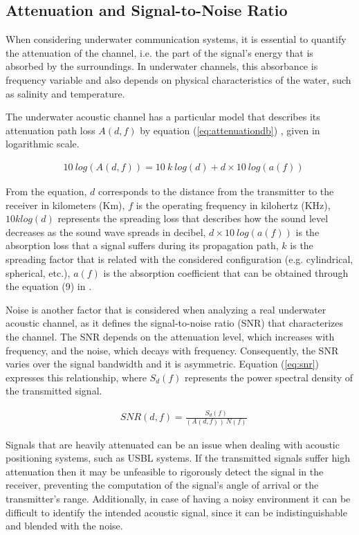 \subsection{Attenuation and Signal-to-Noise Ratio} \label{subsec:snr}

When considering underwater communication systems, it is essential to quantify the attenuation of the channel, i.e. the part of the signal's energy that is absorbed by the surroundings. In underwater channels, this absorbance is frequency variable and also depends on physical characteristics of the water, such as salinity and temperature. 

The underwater acoustic channel has a particular model that describes its attenuation path loss \(A(d,f)\) by equation (\ref{eq:attenuationdb}) \cite{pathloss}, given in logarithmic scale. 

\begin{eqnarray}
&10\ log(A(d,f)) = 10\ k\ log(d) + d \times 10\ log(a(f))
\label{eq:attenuationdb}
\end{eqnarray}

From the equation, \(d\) corresponds to the distance from the transmitter to the receiver in kilometers (Km), \(f\) is the operating frequency in kilohertz (KHz), \(10klog(d)\) represents the spreading loss that describes how the sound level decreases as the sound wave spreads in decibel, \(d \times 10 \ log(a(f))\) is the absorption loss that a signal suffers during its propagation path, \(k\) is the spreading factor that is related with the considered configuration (e.g. cylindrical, spherical, etc.), \(a(f)\) is the absorption coefficient that can be obtained through the equation (9) in \cite{pathloss}.

Noise is another factor that is considered when analyzing a real underwater acoustic channel, as it defines the signal-to-noise ratio (SNR) that characterizes the channel. The SNR depends on the attenuation level, which increases with frequency, and the noise, which decays with frequency. Consequently, the SNR varies over the signal bandwidth and it is asymmetric. Equation (\ref{eq:snr}) \cite{commchan} expresses this relationship, where \(S_{d}(f)\) represents the power spectral density of the transmitted signal.

\begin{eqnarray}
&SNR(d,f) = \frac{S_{d}(f)}{(A(d,f))\ N(f)}
\label{eq:snr}
\end{eqnarray}

Signals that are heavily attenuated can be an issue when dealing with acoustic positioning systems, such as USBL systems. If the transmitted signals suffer high attenuation then it may be unfeasible to rigorously detect the signal in the receiver, preventing the computation of the signal's angle of arrival or the transmitter's range. Additionally, in case of having a noisy environment it can be difficult to identify the intended acoustic signal, since it can be indistinguishable and blended with the noise. 

